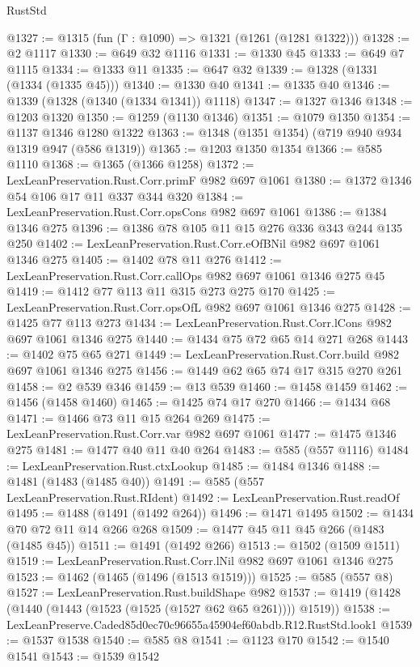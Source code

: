 \begin{lexlean}{RustStd}
\begin{coremodule}
@1327 := @1315 (fun (Γ : @1090) => @1321 (@1261 (@1281 @1322)))
@1328 := @2 @1117
@1330 := @649 @32 @1116
@1331 := @1330 @45
@1333 := @649 @7 @1115
@1334 := @1333 @11
@1335 := @647 @32
@1339 := @1328 (@1331 (@1334 (@1335 @45)))
@1340 := @1330 @40
@1341 := @1335 @40
@1346 := @1339 (@1328 (@1340 (@1334 @1341)) @1118)
@1347 := @1327 @1346
@1348 := @1203 @1320
@1350 := @1259 (@1130 @1346)
@1351 := @1079 @1350
@1354 := @1137 @1346 @1280 @1322
@1363 := @1348 (@1351 @1354) (@719 @940 @934 @1319 @947 (@586 @1319))
@1365 := @1203 @1350 @1354
@1366 := @585 @1110
@1368 := @1365 (@1366 @1258)
@1372 := LexLeanPreservation.Rust.Corr.primF @982 @697 @1061
@1380 := @1372 @1346 @54 @106 @17 @11 @337 @344 @320
@1384 := LexLeanPreservation.Rust.Corr.opsCons @982 @697 @1061
@1386 := @1384 @1346 @275
@1396 := @1386 @78 @105 @11 @15 @276 @336 @343 @244 @135 @250
@1402 := LexLeanPreservation.Rust.Corr.eOfBNil @982 @697 @1061 @1346 @275
@1405 := @1402 @78 @11 @276
@1412 := LexLeanPreservation.Rust.Corr.callOps @982 @697 @1061 @1346 @275 @45
@1419 := @1412 @77 @113 @11 @315 @273 @275 @170
@1425 := LexLeanPreservation.Rust.Corr.opsOfL @982 @697 @1061 @1346 @275
@1428 := @1425 @77 @113 @273
@1434 := LexLeanPreservation.Rust.Corr.lCons @982 @697 @1061 @1346 @275
@1440 := @1434 @75 @72 @65 @14 @271 @268
@1443 := @1402 @75 @65 @271
@1449 := LexLeanPreservation.Rust.Corr.build @982 @697 @1061 @1346 @275
@1456 := @1449 @62 @65 @74 @17 @315 @270 @261
@1458 := @2 @539 @346
@1459 := @13 @539
@1460 := @1458 @1459
@1462 := @1456 (@1458 @1460)
@1465 := @1425 @74 @17 @270
@1466 := @1434 @68
@1471 := @1466 @73 @11 @15 @264 @269
@1475 := LexLeanPreservation.Rust.Corr.var @982 @697 @1061
@1477 := @1475 @1346 @275
@1481 := @1477 @40 @11 @40 @264
@1483 := @585 (@557 @1116)
@1484 := LexLeanPreservation.Rust.ctxLookup
@1485 := @1484 @1346
@1488 := @1481 (@1483 (@1485 @40))
@1491 := @585 (@557 LexLeanPreservation.Rust.RIdent)
@1492 := LexLeanPreservation.Rust.readOf
@1495 := @1488 (@1491 (@1492 @264))
@1496 := @1471 @1495
@1502 := @1434 @70 @72 @11 @14 @266 @268
@1509 := @1477 @45 @11 @45 @266 (@1483 (@1485 @45))
@1511 := @1491 (@1492 @266)
@1513 := @1502 (@1509 @1511)
@1519 := LexLeanPreservation.Rust.Corr.lNil @982 @697 @1061 @1346 @275
@1523 := @1462 (@1465 (@1496 (@1513 @1519)))
@1525 := @585 (@557 @8)
@1527 := LexLeanPreservation.Rust.buildShape @982
@1537 := @1419 (@1428 (@1440 (@1443 (@1523 (@1525 (@1527 @62 @65 @261)))) @1519))
@1538 := LexLeanPreserve.Caded85d0ec70c96655a45904ef60abdb.R12.RustStd.look1
@1539 := @1537 @1538
@1540 := @585 @8
@1541 := @1123 @170
@1542 := @1540 @1541
@1543 := @1539 @1542

\end{coremodule}
\end{lexlean}

